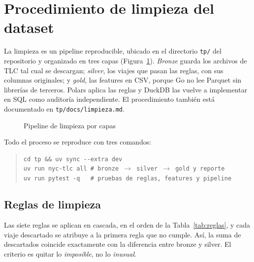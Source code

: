 \section{Procedimiento de limpieza del dataset}\label{sec:limpieza}

La limpieza es un pipeline reproducible, ubicado en el directorio \texttt{tp/} del repositorio y
organizado en tres capas (Figura~\ref{fig:pipeline}). \emph{Bronze} guarda los archivos de TLC tal
cual se descargan; \emph{silver}, los viajes que pasan las reglas, con sus columnas originales; y
\emph{gold}, las features en CSV, porque Go no lee Parquet sin librerías de terceros. Polars aplica
las reglas y DuckDB las vuelve a implementar en SQL como auditoría independiente. El procedimiento
también está documentado en \texttt{tp/docs/limpieza.md}.

\begin{figure}[H]
\caption{Pipeline de limpieza por capas}\label{fig:pipeline}
\centering
\small

\end{figure}

Todo el proceso se reproduce con tres comandos:

\begin{quote}
\small
\texttt{cd tp \&\& uv sync -{}-extra dev}\\
\texttt{uv run nyc-tlc all \quad\# bronze $\rightarrow$ silver $\rightarrow$ gold y reporte}\\
\texttt{uv run pytest -q \quad\ \ \# pruebas de reglas, features y pipeline}
\end{quote}

\subsection{Reglas de limpieza}

Las siete reglas se aplican en cascada, en el orden de la Tabla~\ref{tab:reglas}, y cada viaje
descartado se atribuye a la primera regla que no cumple. Así, la suma de descartados coincide
exactamente con la diferencia entre bronze y silver. El criterio es quitar lo \emph{imposible}, no
lo \emph{inusual}.

